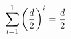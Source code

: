 \documentclass[preview]{standalone}
\begin{document}
\begin{align*}
\sum_{i=1}^{ 1 } \left(\frac{ d }{2} \right)^i = { { d } \over { 2 } }
\end{align*}
\end{document}
